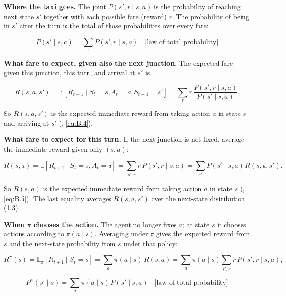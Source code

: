 \textbf{Where the taxi goes.} The joint $P(s',r\mid s,a)$ is the probability of reaching next state $s'$ together with each possible fare (reward) $r$. The probability of being in $s'$ after the turn is the total of those probabilities over every fare:

\begin{equation}
P(s' \mid s,a) = \sum_{r} P(s',r \mid s,a)
\quad\text{[law of total probability]}
\tag{1.3}
\end{equation}

\textbf{What fare to expect, given also the next junction.} The expected fare given this junction, this turn, and arrival at $s'$ is

\begin{equation}
R(s,a,s')
=
\mathbb{E}[R_{t+1} \mid S_t=s, A_t=a, S_{t+1}=s']
=
\sum_{r} r\, \frac{P(s',r \mid s,a)}{P(s' \mid s,a)}.
\tag{1.4}
\end{equation}

So $R(s,a,s')$ is the expected immediate reward from taking action $a$ in state $s$ and arriving at $s'$ (, \eqref{eq:B.4}).

\textbf{What fare to expect for this turn.} If the next junction is not fixed, average the immediate reward given only $(s,a)$:

\begin{equation}
R(s,a)
=
\mathbb{E}[R_{t+1} \mid S_t=s, A_t=a]
=
\sum_{s',r} r\, P(s',r \mid s,a)
=
\sum_{s'} P(s' \mid s,a)\, R(s,a,s').
\tag{1.5}
\end{equation}

So $R(s,a)$ is the expected immediate reward from taking action $a$ in state $s$ (, \eqref{eq:B.5}). The last equality averages $R(s,a,s')$ over the next-state distribution (1.3).

\textbf{When $\pi$ chooses the action.} The agent no longer fixes $a$; at state $s$ it chooses actions according to $\pi(a\mid s)$. Averaging under $\pi$ gives the expected reward from $s$ and the next-state probability from $s$ under that policy:

\begin{equation}
R^\pi(s)
=
\mathbb{E}_\pi[R_{t+1} \mid S_t=s]
=
\sum_a \pi(a \mid s)\, R(s,a)
=
\sum_a \pi(a \mid s) \sum_{s',r} r\, P(s',r \mid s,a),
\tag{1.6}
\end{equation}

\begin{equation}
P^\pi(s' \mid s)
=
\sum_a \pi(a \mid s)\, P(s' \mid s,a)
\quad\text{[law of total probability]}
\tag{1.7}
\end{equation}

